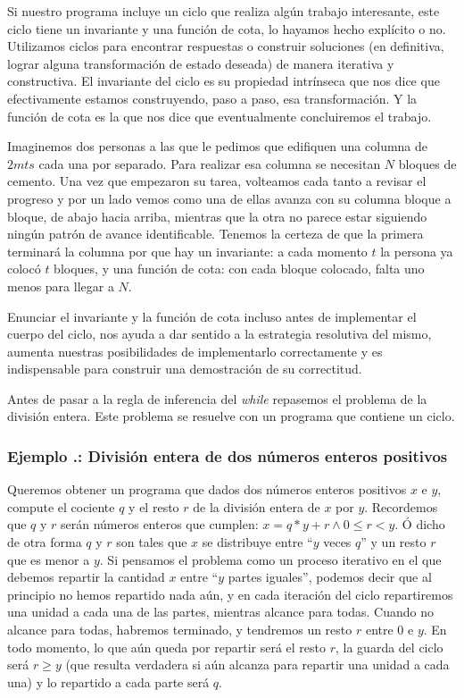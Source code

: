 \documentclass[12pt, a4paper, openany, fleqn]{book}
\newcounter{example}[chapter]
\renewcommand{\theexample}{\thechapter.\arabic{example}}
\newcommand{\example}[1]{
  \refstepcounter{example} %
  \subsubsection*{Ejemplo \theexample: #1}
}
\begin{document}
    Si nuestro programa incluye un ciclo que realiza algún trabajo interesante, este ciclo tiene un invariante y una función de cota, lo hayamos hecho explícito o no. Utilizamos ciclos para encontrar respuestas o construir soluciones (en definitiva, lograr alguna transformación de estado deseada) de manera iterativa y constructiva. El invariante del ciclo es su propiedad intrínseca que nos dice que efectivamente estamos construyendo, paso a paso, esa transformación. Y la función de cota es la que nos dice que eventualmente concluiremos el trabajo.

    Imaginemos dos personas a las que le pedimos que edifiquen una columna de $2mts$ cada una por separado. Para realizar esa columna se necesitan $N$ bloques de cemento. Una vez que empezaron su tarea, volteamos cada tanto a revisar el progreso y por un lado vemos como una de ellas avanza con su columna bloque a bloque, de abajo hacia arriba, mientras que la otra no parece estar siguiendo ningún patrón de avance identificable. Tenemos la certeza de que la primera terminará la columna por que hay un invariante: a cada momento $t$ la persona ya colocó $t$ bloques, y una función de cota: con cada bloque colocado, falta uno menos para llegar a $N$.

    Enunciar el invariante y la función de cota incluso antes de implementar el cuerpo del ciclo, nos ayuda a dar sentido a la estrategia resolutiva del mismo, aumenta nuestras posibilidades de implementarlo correctamente y es indispensable para construir una demostración de su correctitud.

    Antes de pasar a la regla de inferencia del \textit{while} repasemos el problema de la división entera. Este problema se resuelve con un programa que contiene un ciclo.

    \example{División entera de dos números enteros positivos}

    Queremos obtener un programa que dados dos números enteros positivos $x$ e $y$, compute el cociente $q$ y el resto $r$ de la división entera de $x$ por $y$.
    Recordemos que $q$ y $r$ serán números enteros que cumplen:
    $x = q * y + r \land 0 \leqslant r < y$.
    Ó dicho de otra forma $q$ y $r$ son tales que $x$ se distribuye entre ``$y$ veces $q$'' y un resto $r$ que es menor a $y$.
    Si pensamos el problema como un proceso iterativo en el que debemos repartir la cantidad $x$ entre ``$y$ partes iguales'', podemos decir que al principio no hemos repartido nada aún, y en cada iteración del ciclo repartiremos una unidad a cada una de las partes, mientras alcance para todas. Cuando no alcance para todas, habremos terminado, y tendremos un resto $r$ entre 0 e $y$. En todo momento, lo que aún queda por repartir será el resto $r$, la guarda del ciclo será $r \geqslant y$ (que resulta verdadera si aún alcanza para repartir una unidad a cada una) y lo repartido a cada parte será $q$.
\end{document}
